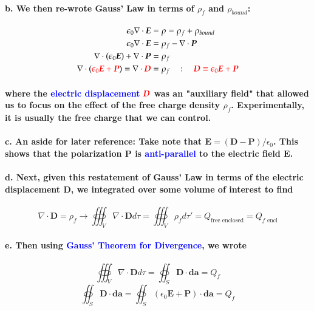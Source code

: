\documentclass{article}
\begin{document}
\paragraph{\indent b. We then re-wrote Gauss' Law in terms of $\rho_f$ and $\rho_{bound}$:}
\begin{align*}
    \epsilon_0\nabla\cdot\boldsymbol{E}&=\rho=\rho_f+\rho_{bound}\\
    \epsilon_0\nabla\cdot\boldsymbol{E}&=\rho_f-\nabla\cdot\boldsymbol{P}\\
    \nabla\cdot(\epsilon_0\boldsymbol{E})+\nabla\cdot\boldsymbol{P}&=\rho_f\\
    \nabla\cdot(\textcolor{red}{\epsilon_0\boldsymbol{E}+\boldsymbol{P}})=\nabla\cdot\textcolor{red}{\boldsymbol{D}}&=\rho_f\quad:\quad \textcolor{red}{\boldsymbol{D}\equiv \epsilon_0\boldsymbol{E}+\boldsymbol{P}}\\
\end{align*}
\paragraph{where the \textcolor{blue}{electric displacement} $\textcolor{red}{\boldsymbol{D}}$ was an "auxiliary field" that allowed us to focus on the effect of the free charge density $\rho_f$. Experimentally, it is usually the free charge that we can control.}
\paragraph{\indent c. An aside for later reference: Take note that $\boldsymbol{E}=(\boldsymbol{D}-\boldsymbol{P})/\epsilon_0$. This shows that the polarization $\boldsymbol{P}$ is \textcolor{blue}{anti-parallel} to the electric field $\boldsymbol{E}$.}
\paragraph{\indent d. Next, given this restatement of Gauss' Law in terms of the electric displacement $\boldsymbol{D}$, we integrated over some volume of interest to find}
\begin{equation*}
    \nabla\cdot\boldsymbol{D}=\rho_f\rightarrow \oiiint_V \nabla\cdot \boldsymbol{D}d\tau=\oiiint_V\rho_fd\tau'=Q_{\text{free enclosed}}=Q_{f \text{ encl}}
\end{equation*}
\paragraph{\indent e. Then using \textcolor{blue}{Gauss' Theorem for Divergence}, we wrote}
\begin{equation*}
    \oiiint_V \nabla\cdot \boldsymbol{D}d\tau=\oiint_S\boldsymbol{D}\cdot\boldsymbol{da}=Q_f
\end{equation*}
\begin{equation*}
    \oiint_S\boldsymbol{D}\cdot\boldsymbol{da}=\oiint_S (\epsilon_0\boldsymbol{E}+\boldsymbol{P})\cdot\boldsymbol{da}=Q_f
\end{equation*}
\end{document}
